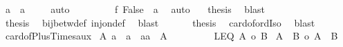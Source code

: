 \begin{isabellebody}
\ {\isachardoublequoteopen}a\ {\isacharequal}{\kern0pt}\ a{}{\isachardoublequoteclose}\ \isamarkupfalse%
\ {\isacharasterisk}{\kern0pt}\ \isamarkupfalse%
\ auto\isanewline
\ \ \ \ \ \ \ \isamarkupfalse%
\ {\isachardoublequoteopen}{\isacharquery}{\kern0pt}f\ False\ {\isacharequal}{\kern0pt}\ a{\isachardoublequoteclose}\ \isamarkupfalse%
\ auto\ \ \isamarkupfalse%
\ {\isacharquery}{\kern0pt}thesis\ \isamarkupfalse%
\ blast\isanewline
\ \ \ \ \ \isamarkupfalse%
\isanewline
\ \ \ \ \isacommand{{\isacharbraceright}{\kern0pt}}\isamarkupfalse%
\isanewline
\ \ \ \ \isamarkupfalse%
\ \isamarkupfalse%
\ {\isacharquery}{\kern0pt}thesis\ \isamarkupfalse%
\ bij{\isacharunderscore}{\kern0pt}betw{\isacharunderscore}{\kern0pt}def\ inj{\isacharunderscore}{\kern0pt}on{\isacharunderscore}{\kern0pt}def\ \isamarkupfalse%
\ blast\isanewline
\ \ \isamarkupfalse%
\isanewline
\ \ \isamarkupfalse%
\ {\isacharquery}{\kern0pt}thesis\ \isamarkupfalse%
\ card{\isacharunderscore}{\kern0pt}of{\isacharunderscore}{\kern0pt}ordIso\ \isamarkupfalse%
\ blast\isanewline
{}\isamarkupfalse%
%
\endisatagproof
{\isafoldproof}%
%
\isadelimproof
\isanewline
%
\endisadelimproof
\isanewline
{}\isamarkupfalse%
\ card{\isacharunderscore}{\kern0pt}of{\isacharunderscore}{\kern0pt}Plus{\isacharunderscore}{\kern0pt}Times{\isacharunderscore}{\kern0pt}aux{\isacharcolon}{\kern0pt}\isanewline
{}\ A{}{\isacharcolon}{\kern0pt}\ {\isachardoublequoteopen}a{}\ {\isasymnoteq}\ a{}\ {\isasymand}\ {\isacharbraceleft}{\kern0pt}a{}{\isacharcomma}{\kern0pt}a{}{\isacharbraceright}{\kern0pt}\ {\isasymle}\ A{\isachardoublequoteclose}\ \isanewline
\ \ \ \ \ \ \ \ LEQ{\isacharcolon}{\kern0pt}\ {\isachardoublequoteopen}{\isacharbar}{\kern0pt}A{\isacharbar}{\kern0pt}\ {\isasymle}o\ {\isacharbar}{\kern0pt}B{\isacharbar}{\kern0pt}{\isachardoublequoteclose}\isanewline
{}\ {\isachardoublequoteopen}{\isacharbar}{\kern0pt}A\ {\isacharless}{\kern0pt}{\isacharplus}{\kern0pt}{\isachargreater}{\kern0pt}\ B{\isacharbar}{\kern0pt}\ {\isasymle}o\ {\isacharbar}{\kern0pt}A\ {\isasymtimes}\ B{\isacharbar}{\kern0pt}{\isachardoublequoteclose}\isanewline
%
\isadelimproof
%
\endisadelimproof
%
\isatagproof
{}\isamarkupfalse%
{\isacharminus}{\kern0pt}\isanewline

\end{isabellebody}

